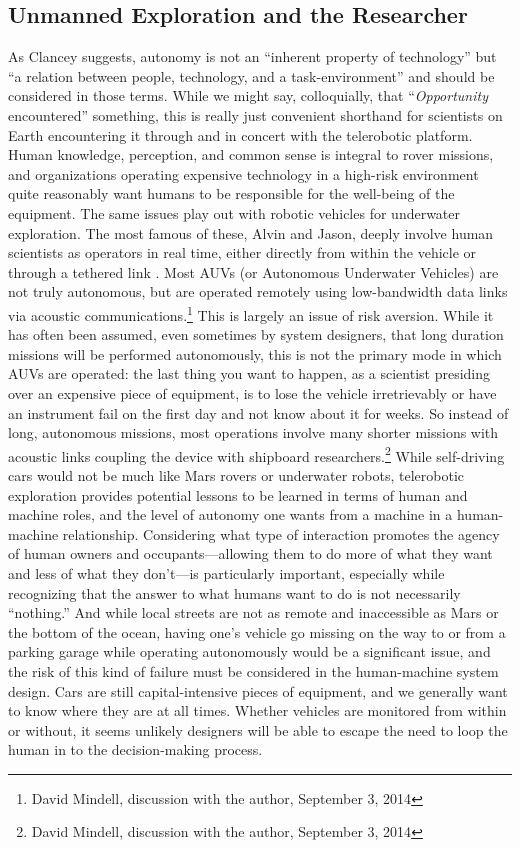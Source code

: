 \subsection{Unmanned Exploration and the Researcher}

As Clancey suggests, autonomy is not an ``inherent property of
technology'' but ``a relation between people, technology, and a
task-environment'' and should be considered in those terms\cite[p.
  119]{clancey}. While we might say, colloquially, that 
``\emph{Opportunity} encountered'' something,\cite[p. 8]{clancey} this
is really just convenient shorthand for scientists on Earth encountering it
through and in concert with the telerobotic platform. Human knowledge,
perception, and common sense is integral to rover missions, and
organizations operating expensive 
technology in a high-risk environment quite reasonably want humans to
be responsible
for the well-being of the equipment. The same issues play out with
robotic vehicles for underwater exploration. The most famous of these,
Alvin and Jason, deeply involve human scientists as operators in real
time, either directly from within the vehicle or through a tethered
link \cite{NOAA1} \cite{NOAA2}. Most AUVs (or Autonomous Underwater
Vehicles) are not 
truly autonomous, but are operated remotely using low-bandwidth data
links via acoustic communications.\footnote{David Mindell, discussion
  with the author, September 3, 2014} This is largely an issue of risk
aversion. While it has often been assumed, even sometimes by system
designers, that long duration missions will be performed autonomously,
this is not the primary mode in which AUVs are operated: the last
thing you want to happen, as a scientist presiding over an expensive
piece of equipment, is to lose the vehicle irretrievably or have an
instrument fail on the first day and not know about it for weeks. So
instead of long, autonomous missions, most operations involve many
shorter missions with acoustic links coupling the device with
shipboard researchers.\footnote{David Mindell, discussion with the
  author, September 3, 2014} While self-driving cars would not
be much like Mars rovers or underwater robots, telerobotic exploration
provides potential lessons
to be learned in terms of human and machine roles, and the level of
autonomy one wants from a machine in a human-machine relationship.
Considering what type of interaction promotes the agency
of human owners and occupants---allowing them to do more of what they
want and less of what they don't---is particularly important,
especially while recognizing that the answer to what humans want to do
is not necessarily ``nothing.'' And while local streets are not as
remote and inaccessible as Mars or the bottom of the ocean, having
one's vehicle go missing on the way to or from a parking garage while
operating autonomously would be a significant issue, and the risk of
this kind of failure must be considered in the human-machine system
design. Cars are still capital-intensive pieces of equipment, and we
generally want to know where they are at all times. Whether vehicles
are monitored
from within or without, it seems unlikely designers will be able to
escape the need to loop the human in to the decision-making process.

